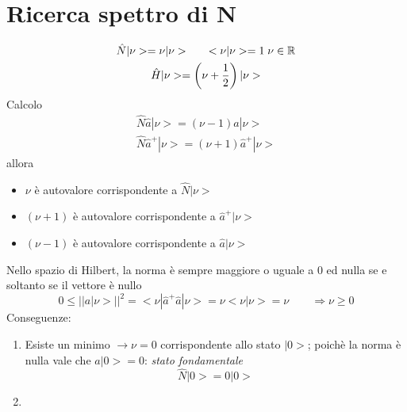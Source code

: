 \section{Ricerca spettro di N}

\begin{gather*}
    \hat{N}|\nu> = \nu|\nu> \qquad <\nu|\nu> = 1 \; \nu\in \mathbb{R} \\
    \hat{H}|\nu> = \left(\nu + \frac{1}{2}\right)|\nu>
\end{gather*}
Calcolo
\begin{gather*}
    \hat{N}\hat{a}|\nu> = (\nu-1)\hat{a}|\nu>  \tag{4} \\
    \hat{N}\hat{a}^+ |\nu> = (\nu+1) \hat{a}^+|\nu> \tag{5}
\end{gather*}
allora
\begin{itemize}
    \item \(\nu\) è autovalore corrispondente a \(\hat{N}|\nu>\)
    \item \((\nu+1)\) è autovalore corrispondente a \(\hat{a}^+|\nu>\)
    \item \((\nu-1)\) è autovalore corrispondente a \(\hat{a}|\nu>\)
\end{itemize}
Nello spazio di Hilbert, la norma è sempre maggiore o uguale a 0 ed nulla se e soltanto se il vettore è nullo
\begin{equation*}
    0 \leq {||a|\nu>||}^2 = <\nu|\hat{a}^+\hat{a}|\nu> = \nu <\nu|\nu> = \nu \qquad \Rightarrow \nu \geq 0
\end{equation*}
Conseguenze:
\begin{enumerate}
    \item Esiste un minimo \(\rightarrow \nu =0\) corrispondente allo stato \(|0>\); poichè la norma è nulla vale che \(a|0> = 0\): \textit{stato fondamentale}
    \begin{equation*}
        \hat{N}|0> = 0|0> 
    \end{equation*}
    \item 
\end{enumerate}